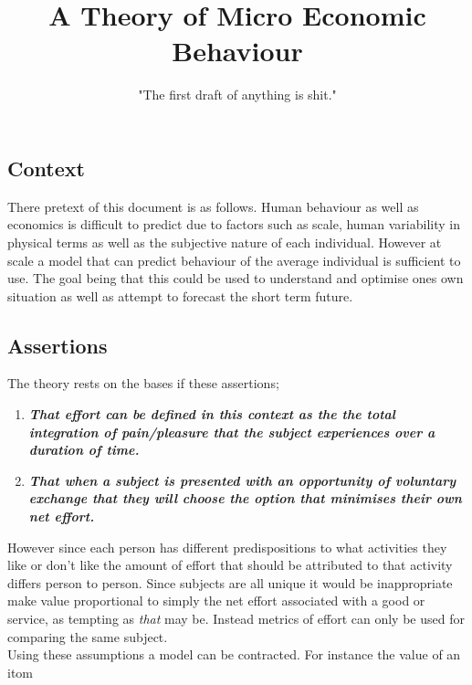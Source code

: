 \documentclass[]{article}
\title{A Theory of Micro Economic Behaviour}
\author{"The first draft of anything is shit."}
\begin{document}
\maketitle
\newpage




\subsection{Context}

There pretext of this document is as  follows. Human behaviour as well as economics is difficult to predict due to factors such as scale, human variability in physical terms as well as the subjective nature of each individual. However at scale a model that can predict behaviour of the average individual is sufficient to use. The goal being that this could be used to understand and optimise ones own situation as well as attempt to forecast the short term future.

\subsection{Assertions}

The theory rests on the bases if these assertions;
\begin{enumerate}
  \item \textbf{\textit{That effort can be defined in this context as the the total integration of pain/pleasure that the subject experiences over a duration of time.}}
  \item \textbf{ \textit{That when a subject is presented with an opportunity of voluntary exchange that they will choose the option that minimises their own net effort.}}

\end{enumerate}

However since each person has different predispositions to what activities they like or don't like the amount of effort that should be attributed to that activity differs person to person. Since subjects are all unique it would be inappropriate make value proportional to simply the net effort associated with a good or service, as tempting as \textit{that} may be. Instead metrics of effort can only be used for comparing the same subject.  \\

Using these assumptions a model can be contracted. For instance the value of an itom 
\end{document}
